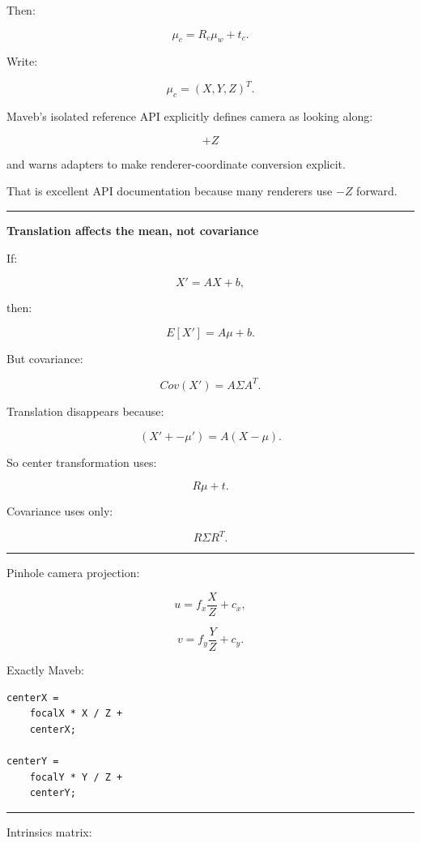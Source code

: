Then:

\[
\boxed{
\mu_c
=
R_c\mu_w+t_c.
}
\]

Write:

\[
\mu_c=
(X,Y,Z)^T.
\]

Maveb's isolated reference API explicitly defines camera as looking along:

\[
\boxed{+Z}
\]

and warns adapters to make renderer-coordinate conversion explicit.

That is excellent API documentation because many renderers use \(-Z\) forward.

\begin{center}\rule{0.5\linewidth}{0.5pt}\end{center}

\textbf{Translation affects the mean, not covariance}

If:

\[
X'=AX+b,
\]

then:

\[
E[X']
=
A\mu+b.
\]

But covariance:

\[
Cov(X')
=
A\Sigma A^T.
\]

Translation disappears because:

\[
(X'+-\mu')
=
A(X-\mu).
\]

So center transformation uses:

\[
R\mu+t.
\]

Covariance uses only:

\[
R\Sigma R^T.
\]

\begin{center}\rule{0.5\linewidth}{0.5pt}\end{center}

Pinhole camera projection:

\[
u=
f_x\frac{X}{Z}
+
c_x,
\]

\[
v=
f_y\frac{Y}{Z}
+
c_y.
\]

Exactly Maveb:

\begin{verbatim}
centerX =
    focalX * X / Z +
    centerX;

centerY =
    focalY * Y / Z +
    centerY;
\end{verbatim}

\begin{center}\rule{0.5\linewidth}{0.5pt}\end{center}

Intrinsics matrix:

